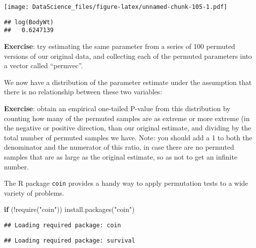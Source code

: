 \documentclass[
]{book}
\newenvironment{Shaded}{\begin{snugshade}}{\end{snugshade}}
\newcommand{\AttributeTok}[1]{\textcolor[rgb]{0.77,0.63,0.00}{#1}}
\newcommand{\ControlFlowTok}[1]{\textcolor[rgb]{0.13,0.29,0.53}{\textbf{#1}}}
\newcommand{\DecValTok}[1]{\textcolor[rgb]{0.00,0.00,0.81}{#1}}
\newcommand{\FunctionTok}[1]{\textcolor[rgb]{0.00,0.00,0.00}{#1}}
\newcommand{\NormalTok}[1]{#1}
\newcommand{\OtherTok}[1]{\textcolor[rgb]{0.56,0.35,0.01}{#1}}
\newcommand{\SpecialCharTok}[1]{\textcolor[rgb]{0.00,0.00,0.00}{#1}}
\newcommand{\StringTok}[1]{\textcolor[rgb]{0.31,0.60,0.02}{#1}}
\begin{document}
\texttt{[image: DataScience\_files/figure-latex/unnamed-chunk-105-1.pdf]}

\begin{Shaded}
\end{Shaded}

\begin{verbatim}
## log(BodyWt) 
##   0.6247139
\end{verbatim}

\textbf{Exercise}: try estimating the same parameter from a series of 100 permuted versions of our original data, and collecting each of the permuted parameters into a vector called ``permvec''.

We now have a distribution of the parameter estimate under the assumption that there is no relationship between these two variables:

\textbf{Exercise}: obtain an empirical one-tailed P-value from this distribution by counting how many of the permuted samples are as extreme or more extreme (in the negative or positive direction, than our original estimate, and dividing by the total number of permuted samples we have. Note: you should add a 1 to both the denominator and the numerator of this ratio, in case there are no permuted samples that are as large as the original estimate, so as not to get an infinite number.

The R package \texttt{coin} provides a handy way to apply permutation tests to a wide variety of problems.

\begin{Shaded}
\begin{Highlighting}[]
\ControlFlowTok{if}\NormalTok{ (}\SpecialCharTok{!}\FunctionTok{require}\NormalTok{(}\StringTok{"coin"}\NormalTok{)) }\FunctionTok{install.packages}\NormalTok{(}\StringTok{"coin"}\NormalTok{)}
\end{Highlighting}
\end{Shaded}

\begin{verbatim}
## Loading required package: coin
\end{verbatim}

\begin{verbatim}
## Loading required package: survival
\end{verbatim}
\end{document}
